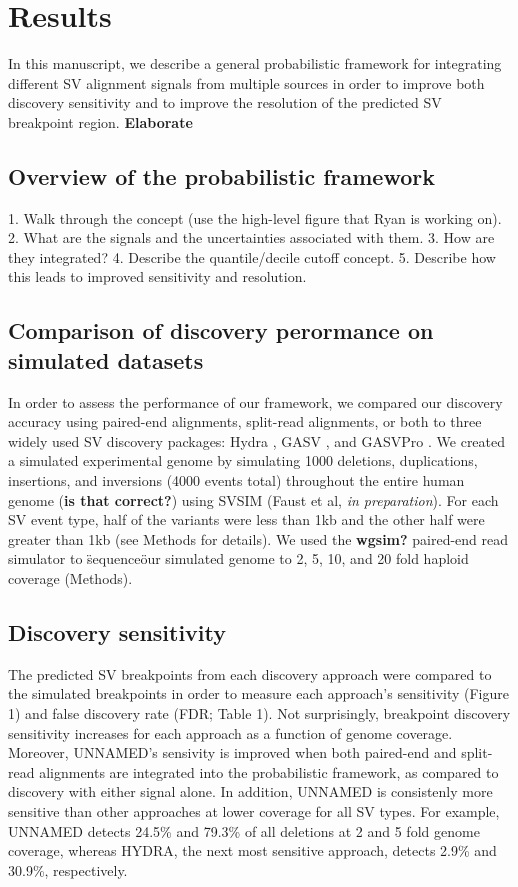 \documentclass[11pt]{article}
\begin{document}
\section{Results}

In this manuscript, we describe a general probabilistic framework for 
integrating different SV alignment signals from multiple sources in order 
to improve both discovery sensitivity and to improve the resolution of the 
predicted SV breakpoint region.
\textbf{Elaborate}

\subsection{Overview of the probabilistic framework}
1. Walk through the concept (use the high-level figure that Ryan is working on).
2. What are the signals and the uncertainties associated with them.
3. How are they integrated?
4. Describe the quantile/decile cutoff concept.
5. Describe how this leads to improved sensitivity and resolution.


\subsection{Comparison of discovery perormance on simulated datasets}
In order to assess the performance of our framework, we compared our discovery
accuracy using paired-end alignments, split-read alignments, or both to 
three widely used SV discovery packages: Hydra \cite{Quinlan2010},
GASV \cite{Raphael2009}, and GASVPro \cite{Sindi2012}. We created a simulated 
experimental genome by simulating 1000 deletions, duplications, insertions, 
and inversions (4000 events total) throughout the entire human genome
(\textbf{is that correct?}) using SVSIM (Faust et al, \emph{in preparation}). 
For each SV event type, half of the variants were less than 1kb and the other 
half were greater than 1kb (see Methods for details).  We used the 
\textbf{wgsim?} paired-end read simulator to \"sequence\" our simulated 
genome to 2, 5, 10, and 20 fold haploid coverage (Methods).

\subsection{Discovery sensitivity}
The predicted SV breakpoints from each discovery approach were compared to the
simulated breakpoints in order to measure each approach's sensitivity (Figure 1) 
and false discovery rate (FDR; Table 1). Not surprisingly, breakpoint discovery
sensitivity increases for each approach as a function of genome coverage.
Moreover, UNNAMED's sensivity is improved when both paired-end and split-read
alignments are integrated into the probabilistic framework, as compared to 
discovery with either signal alone. In addition, UNNAMED is consistenly more
sensitive than other approaches at lower coverage for all SV types. For example,
UNNAMED detects 24.5\% and 79.3\% of all deletions at 2 and 5 fold genome
coverage, whereas HYDRA, the next most sensitive approach, detects 2.9\% and
30.9\%, respectively. 
\end{document}
